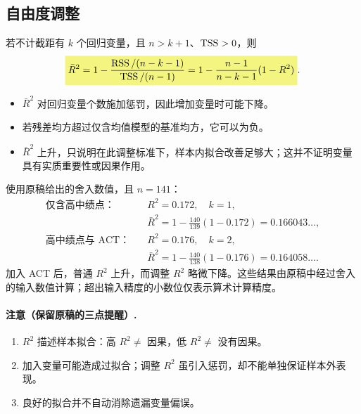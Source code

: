 \subsection{自由度调整}
若不计截距有 $k$ 个回归变量，且 $n>k+1$、$\operatorname{TSS}>0$，则
\begin{equation}\label{eq:adjusted-r2}
\hm{\bar R^2=1-\frac{\RSS/(n-k-1)}{\TSS/(n-1)}
=1-\frac{n-1}{n-k-1}(1-R^2)}.
\end{equation}
\begin{itemize}
\item $\bar R^2$ 对回归变量个数施加惩罚，因此增加变量时可能下降。
\item 若残差均方超过仅含均值模型的基准均方，它可以为负。
\item $\bar R^2$ 上升，只说明在此调整标准下，样本内拟合改善足够大；这并不证明变量具有实质重要性或因果作用。
\end{itemize}

\begin{example}
使用原稿给出的舍入数值，且 $n=141$：
\begin{align*}
\text{仅含高中绩点：}\quad &R^2=0.172,\quad k=1,\\
&\bar R^2=1-\frac{140}{139}(1-0.172)=0.166043\ldots,\\
\text{高中绩点与 ACT：}\quad &R^2=0.176,\quad k=2,\\
&\bar R^2=1-\frac{140}{138}(1-0.176)=0.164058\ldots.
\end{align*}
加入 ACT 后，普通 $R^2$ 上升，而调整 $R^2$ 略微下降。这些结果由原稿中经过舍入的输入数值计算；超出输入精度的小数位仅表示算术计算精度。
\end{example}

\paragraph{注意（保留原稿的三点提醒）.}
\begin{enumerate}
\item $R^2$ 描述样本拟合：高 $R^2\ne$ 因果，低 $R^2\ne$ 没有因果。
\item 加入变量可能造成过拟合；调整 $R^2$ 虽引入惩罚，却不能单独保证样本外表现。
\item 良好的拟合并不自动消除遗漏变量偏误。
\end{enumerate}


